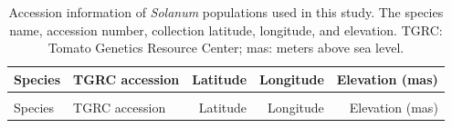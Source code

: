 \documentclass[
  letterpaper,
  DIV=11,
  numbers=noendperiod]{scrartcl}
\begin{document}
\begin{longtable}{>{\raggedright\arraybackslash}p{3.25cm}lrrr}

\caption{\label{tbl-populations}Accession information of \emph{Solanum}
populations used in this study. The species name, accession number,
collection latitude, longitude, and elevation. TGRC: Tomato Genetics
Resource Center; mas: meters above sea level.}

\tabularnewline

\toprule
Species & TGRC accession & Latitude & Longitude & Elevation (mas)\\
\midrule
\endfirsthead
\multicolumn{5}{@{}l}{\textit{(continued)}}\\
\toprule
Species & TGRC accession & Latitude & Longitude & Elevation (mas)\\
\midrule
\endhead


\end{longtable}
\end{document}
